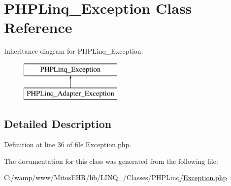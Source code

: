 \hypertarget{class_p_h_p_linq___exception}{\section{\-P\-H\-P\-Linq\-\_\-\-Exception \-Class \-Reference}
\label{class_p_h_p_linq___exception}
}
\-Inheritance diagram for \-P\-H\-P\-Linq\-\_\-\-Exception\-:\begin{figure}[H]
\begin{center}
\leavevmode
\includegraphics[height=2.000000cm]{class_p_h_p_linq___exception}
\end{center}
\end{figure}


\subsection{\-Detailed \-Description}


\-Definition at line 36 of file \-Exception.\-php.



\-The documentation for this class was generated from the following file\-:\begin{DoxyCompactItemize}
\item 
\-C\-:/wamp/www/\-Mitos\-E\-H\-R/lib/\-L\-I\-N\-Q\-\_/\-Classes/\-P\-H\-P\-Linq/\hyperlink{_exception_8php}{\-Exception.\-php}\end{DoxyCompactItemize}
